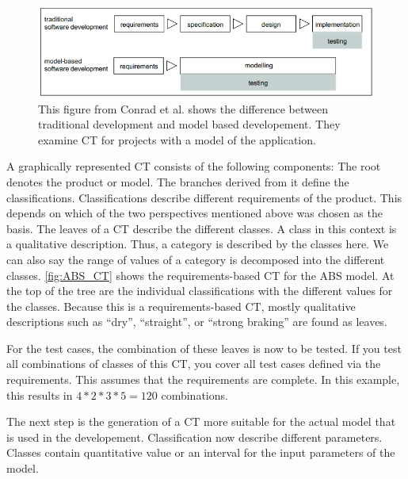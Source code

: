 \begin{figure}[H]
\centering
\includegraphics[scale=0.75]{../../individual/groeger/images/TraditionalVSModel.png} 
\caption{This figure from Conrad et al.\cite{Conrad2005} shows the difference between traditional development and model based developement. They examine CT for projects with a model of the application.}
\label{fig:tradditional_vs_modelbased}
\end{figure}

A graphically represented CT consists of the following components: The root denotes the product or model. The branches derived from it define the classifications. Classifications describe different requirements of the product. This depends on which of the two perspectives mentioned above was chosen as the basis. The leaves of a CT describe the different classes. A class in this context is a qualitative description. Thus, a category is described by the classes here. We can also say the range of values of a category is decomposed into the different classes. \autoref{fig:ABS_CT} shows the requirements-based CT for the ABS model. At the top of the tree are the individual classifications with the different values for the classes. Because this is a requirements-based CT, mostly qualitative descriptions such as \enquote{dry}, \enquote{straight}, or \enquote{strong braking} are found as leaves.  

For the test cases, the combination of these leaves is now to be tested. If you test all combinations of classes of this CT, you cover all test cases defined via the requirements. This assumes that the requirements are complete. In this example, this results in $4*2*3*5 = 120$ combinations.

The next step is the generation of a CT more suitable for the actual model that is used in the developement. Classification now describe different parameters. Classes contain quantitative value or an interval for the input parameters of the model. 

